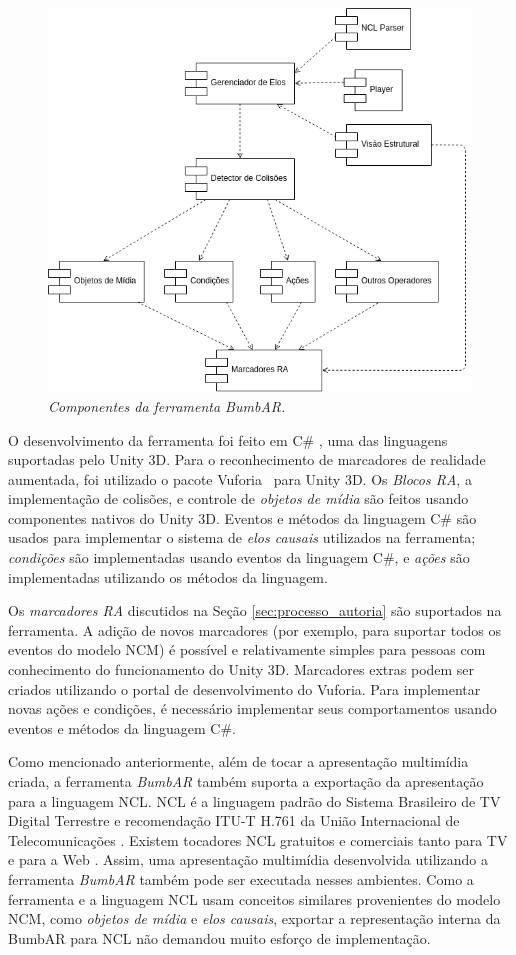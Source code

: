 \documentclass[../main.tex]{subfiles}
\begin{document}
\begin{figure}[!ht]
\centering
\includegraphics[width=0.65\linewidth]{IMG/componentes.png}
\caption{\textit{Componentes da ferramenta BumbAR.}}
\label{fig:componentes}
\end{figure}

O desenvolvimento da ferramenta foi feito em C\# \cite{hejlsberg2006c}, uma das linguagens suportadas pelo Unity 3D. Para o reconhecimento de marcadores de realidade aumentada, foi utilizado o pacote Vuforia~\cite{vuforia} para Unity 3D. Os \emph{Blocos RA}, a implementação de colisões, e controle de \emph{objetos de mídia} são feitos usando componentes nativos do Unity 3D. Eventos e métodos da linguagem C\# são usados para implementar o sistema de \emph{elos causais} utilizados na ferramenta; \emph{condições} são implementadas usando eventos da linguagem C\#, e \emph{ações} são implementadas utilizando os métodos da linguagem.

Os \emph{marcadores RA} discutidos na Seção \ref{sec:processo_autoria} são suportados na ferramenta. A adição de novos marcadores (por exemplo, para suportar todos os eventos do modelo NCM) é possível e relativamente simples para pessoas com conhecimento do funcionamento do Unity 3D. Marcadores extras podem ser criados utilizando o portal de desenvolvimento do Vuforia. Para implementar novas ações e condições, é necessário implementar seus comportamentos usando eventos e métodos da linguagem C\#.

Como mencionado anteriormente, além de tocar a apresentação multimídia criada, a ferramenta \emph{BumbAR} também suporta a exportação da apresentação para a linguagem NCL. NCL é a linguagem padrão do Sistema Brasileiro de TV Digital Terrestre \cite{abnt201115606} e recomendação ITU-T H.761 da União Internacional de Telecomunicações \cite{itu761}. Existem tocadores NCL gratuitos e comerciais tanto para TV \cite{soares_ginga-ncl_2010} e para a Web \cite{melo_webncl_2012, silva_ncl4web_2013}. Assim, uma apresentação multimídia desenvolvida utilizando a ferramenta \emph{BumbAR} também pode ser executada nesses ambientes. Como a ferramenta e a linguagem NCL usam conceitos similares provenientes do modelo NCM, como \emph{objetos de mídia} e \emph{elos causais}, exportar a representação interna da BumbAR para NCL não demandou muito esforço de implementação.
\end{document}
